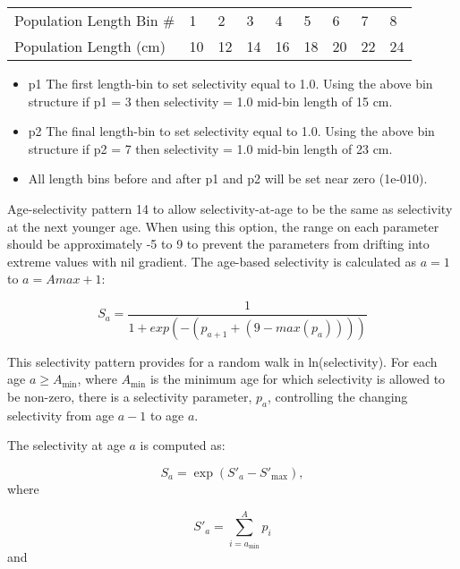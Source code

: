 \begin{longtable}{p{4cm} p{0.9cm} p{0.9cm} p{0.9cm} p{0.9cm} p{0.9cm} p{0.9cm} p{0.9cm} p{0.9cm}}
	\hline	
	Population Length Bin \# \Tstrut & 1 & 2 & 3 & 4 & 5 & 6 & 7 & 8 \\
	Population Length (cm)      & 10 & 12 & 14 & 16 & 18 & 20 & 22 & 24 \Bstrut\\
	\hline
\end{longtable} 

\begin{itemize}
	\item p1 The first length-bin to set selectivity equal to 1.0. Using the above bin structure if p1 = 3 then selectivity = 1.0 mid-bin length of 15 cm.
	\item p2 The final length-bin to set selectivity equal to 1.0. Using the above bin structure if p2 = 7 then selectivity = 1.0 mid-bin length of 23 cm.
	\item All length bins before and after p1 and p2 will be set near zero (1e-010).
\end{itemize}

\hypertarget{ReviseAge}{}
Age-selectivity pattern 14 to allow selectivity-at-age to be the same as selectivity at the next younger age. When using this option, the range on each parameter should be approximately -5 to 9 to prevent the parameters from drifting into extreme values with nil gradient. The age-based selectivity is calculated as $a = 1$ to $a = Amax + 1$:

\begin{equation}
	S_a = \frac{1}{1+exp(-(p_{a+1} + (9 - max(p_a))))}
\end{equation}	

\hypertarget{RandomWalk}{}
This selectivity pattern provides for a random walk in ln(selectivity). For each age $a \geq A_{\text{min}}$, where $A_{\text{min}}$ is the minimum age for which selectivity is allowed to be non-zero, there is a selectivity parameter, $p_a$, controlling the changing selectivity from age $a-1$ to age $a$.
	
The selectivity at age $a$ is computed as:

	\begin{equation}
	S_a = \exp (S'_a - S'_{\text{max}}),
	\end{equation}
where

	\begin{equation}
	S'_a = \sum_{i = a_{\text{min}}}^A p_i
	\end{equation}
and
 
